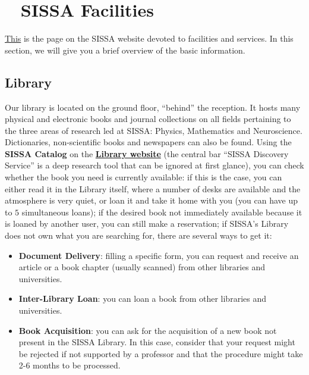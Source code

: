 \documentclass{sissavademecum}
\begin{document}




\chapter{\texorpdfstring{\faUniversity\ }{} SISSA Facilities}

\href{https://www.sissa.it/facilities-and-services}{This} is the page on the SISSA website devoted to facilities and services. In this section, we will give you a brief overview of the basic information.


\section{Library}\label{sec:Library}

Our library is located on the ground floor, ``behind'' the reception. It hosts many physical and electronic books and journal collections on all fields pertaining to the three areas of research led at SISSA: Physics, Mathematics and Neuroscience. Dictionaries, non-scientific books and newspapers can also be found. Using the \textbf{SISSA Catalog} on the  \href{http://library.sissa.it}{\textbf{Library website}} (the central bar ``SISSA Discovery Service'' is a deep research tool that can be ignored at first glance), you can check whether the book you need is currently available: if this is the case, you can either read it in the Library itself, where a number of desks are available and the atmosphere is very quiet, or loan it and take it home with you (you can have up to $5$ simultaneous loans); if the desired book not immediately available because it is loaned by another user, you can still make a reservation; if SISSA's Library does not own what you are searching for, there are several ways to get it:
\begin{itemize}
    \item \textbf{Document Delivery}: filling a specific form, you can request and receive an article or a book chapter (usually scanned) from other libraries and universities.
    \item \textbf{Inter-Library Loan}: you can loan a book from other libraries and universities.
    \item \textbf{Book Acquisition}: you can ask for the acquisition of a new book not present in the SISSA Library. In this case, consider that your request might be rejected if not supported by a professor and that the procedure might take 2-6 months to be processed. 
\end{itemize}
\end{document}
